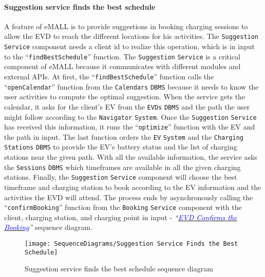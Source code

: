 \paragraph{\texorpdfstring{\protect\hypertarget{suggestionfindsschedule}{Suggestion service finds the best schedule}}{}}
A feature of eMALL is to provide suggestions in booking charging sessions to allow the EVD to reach the different locations for his activities.
The \verb|Suggestion| \verb|Service| component needs a client id to realize this operation, which is in input to the ``\verb|findBestSchedule|'' function.
The \verb|Suggestion| \verb|Service| is a critical component of eMALL because it communicates with different modules and external APIs.
At first, the ``\verb|findBestSchedule|'' function calls the ``\verb|openCalendar|'' function from the \verb|Calendars| \verb|DBMS| because it needs to know the user activities to compute the optimal suggestion.
When the service gets the calendar, it asks for the client's EV from the \verb|EVDs| \verb|DBMS| and the path the user might follow according to the \verb|Navigator| \verb|System|.
Once the \verb|Suggestion| \verb|Service| has received this information, it runs the ``\verb|optimize|'' function with the EV and the path in input.
The last function orders the \verb|EV| \verb|System| and the \verb|Charging| \verb|Stations| \verb|DBMS| to provide the EV's battery status and the list of charging stations near the given path.
With all the available information, the service asks the \verb|Sessions| \verb|DBMS| which timeframes are available in all the given charging stations.
Finally, the \verb|Suggestion| \verb|Service| component will choose the best timeframe and charging station to book according to the EV information and the activities the EVD will attend.
The process ends by asynchronously calling the ``\verb|confirmBooking|'' function from the \verb|Booking| \verb|Service| component with the client, charging station, and charging point in input - \textit{``}\hyperlink{evdconfirmsbooking}{\textcolor{blue}{\textit{EVD Confirms the Booking}}}\textit{''} sequence diagram.
\begin{figure}[H]
    \begin{center}
        \texttt{[image: SequenceDiagrams/Suggestion Service Finds the Best Schedule]}
        \caption{Suggestion service finds the best schedule sequence diagram}
        \label{suggestion_service_finds_best_schedule}
    \end{center}
\end{figure}

